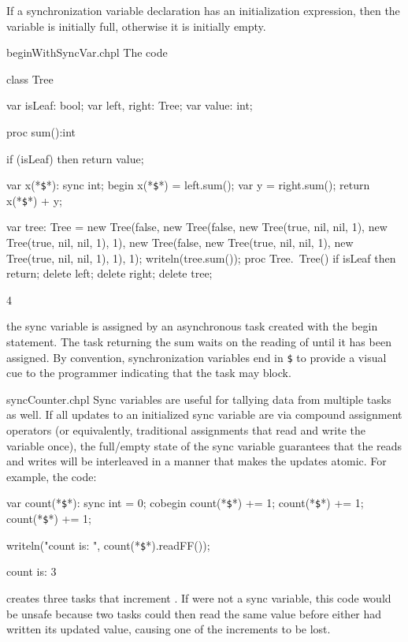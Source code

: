 If a synchronization variable declaration has an initialization
expression, then the variable is initially full, otherwise it is
initially empty.

\begin{chapelexample}{beginWithSyncVar.chpl}
The code
\begin{chapel}
class Tree {
  var isLeaf: bool;
  var left, right: Tree;
  var value: int;

  proc sum():int {
    if (isLeaf) then 
       return value;

    var x(*\texttt{\$}*): sync int;
    begin x(*\texttt{\$}*) = left.sum();
    var y = right.sum();
    return x(*\texttt{\$}*) + y;
  }
}
\end{chapel}
\begin{chapelpost}
var tree: Tree = new Tree(false, new Tree(false, new Tree(true, nil, nil, 1),
                                                 new Tree(true, nil, nil, 1), 1),
                                 new Tree(false, new Tree(true, nil, nil, 1),
                                                 new Tree(true, nil, nil, 1), 1), 1);
writeln(tree.sum());
proc Tree.~Tree() {
  if isLeaf then return;
  delete left;
  delete right;
}
delete tree;
\end{chapelpost}
\begin{chapeloutput}
4
\end{chapeloutput}
the sync variable  is assigned by an
asynchronous task created with the begin statement.  The task
returning the sum waits on the reading of 
until it has been assigned.  By convention, synchronization variables
end in \texttt{\$} to provide a visual cue to the programmer
indicating that the task may block.
\end{chapelexample}

\begin{chapelexample}{syncCounter.chpl}
Sync variables are useful for tallying data from multiple tasks as
well.  If all updates to an initialized sync variable are via compound
assignment operators (or equivalently, traditional assignments that
read and write the variable once), the full/empty state of the sync
variable guarantees that the reads and writes will be interleaved
in a manner that makes the updates atomic.  For example, the code:
\begin{chapel}
var count(*\texttt{\$}*): sync int = 0;
cobegin {
  count(*\texttt{\$}*) += 1;
  count(*\texttt{\$}*) += 1;
  count(*\texttt{\$}*) += 1;
}
\end{chapel}
\begin{chapelpost}
writeln("count is: ", count(*\texttt{\$}*).readFF());
\end{chapelpost}
\begin{chapeloutput}
count is: 3
\end{chapeloutput}
creates three tasks that increment .
If  were not a sync variable, this code
would be unsafe because two tasks could then read the same value
before either had written its updated value, causing one of the
increments to be lost.
\end{chapelexample}

